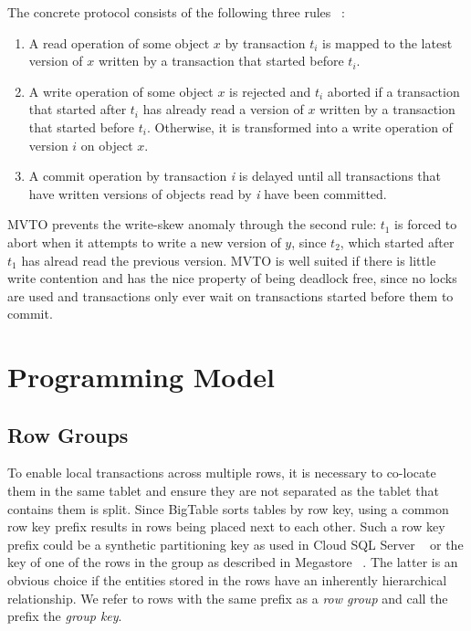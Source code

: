 \documentclass[10pt,final,journal]{IEEEtran}
\begin{document}
The concrete protocol consists of the following three rules ~\cite{Weikum:2001:TIS}:
\begin{enumerate}
\item A read operation of some object $x$ by transaction $t_i$ is mapped to the latest version of $x$ written by a transaction that started before $t_i$.
\item A write operation of some object $x$ is rejected and $t_i$ aborted if a transaction that started after $t_i$ has already read a version of $x$ written by a transaction that started before $t_i$. Otherwise, it is transformed into a write operation of version $i$ on object $x$.
\item A commit operation by transaction \emph{i} is delayed until all transactions that have written versions of objects read by \emph{i} have been committed.
\end{enumerate}

MVTO prevents the write-skew anomaly through the second rule: $t_1$ is forced to abort when it attempts to write a new version of $y$, since $t_2$, which started after $t_1$ has alread read the previous version. MVTO is well suited if there is little write contention and has the nice property of being deadlock free, since no locks are used and transactions only ever wait on transactions started before them to commit.

\section{Programming Model}

\subsection{Row Groups}
To enable local transactions across multiple rows, it is necessary to co-locate them in the same tablet and ensure they are not separated as the tablet that contains them is split. Since BigTable sorts tables by row key, using a common row key prefix results in rows being placed next to each other. Such a row key prefix could be a synthetic partitioning key as used in Cloud SQL Server ~\cite{Bernstein:2011:AMS:2004686.2005651} or the key of one of the rows in the group as described in Megastore ~\cite{Baker:2011:8530095}. The latter is an obvious choice if the entities stored in the rows have an inherently hierarchical relationship. We refer to rows with the same prefix as a \emph{row group} and call the prefix the \emph{group key}.
\end{document}
